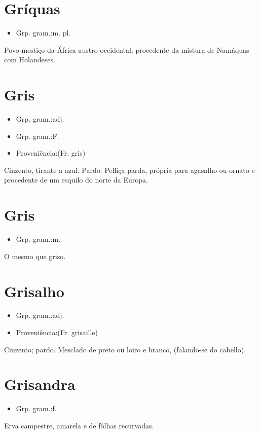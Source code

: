 \section{Gríquas}
\begin{itemize}
\item {Grp. gram.:m. pl.}
\end{itemize}
Povo mestiço da África austro-occidental, procedente da mistura de Namáquas com Holandeses.
\section{Gris}
\begin{itemize}
\item {Grp. gram.:adj.}
\end{itemize}
\begin{itemize}
\item {Grp. gram.:F.}
\end{itemize}
\begin{itemize}
\item {Proveniência:(Fr. \textunderscore gris\textunderscore )}
\end{itemize}
Cinzento, tirante a azul.
Pardo.
Pelliça parda, própria para agasalho ou ornato e procedente de um esquilo do norte da Europa.
\section{Gris}
\begin{itemize}
\item {Grp. gram.:m.}
\end{itemize}
O mesmo que \textunderscore griso\textunderscore .
\section{Grisalho}
\begin{itemize}
\item {Grp. gram.:adj.}
\end{itemize}
\begin{itemize}
\item {Proveniência:(Fr. \textunderscore grisaille\textunderscore )}
\end{itemize}
Cinzento; pardo.
Mesclado de preto ou loiro e branco, (falando-se do cabello).
\section{Grisandra}
\begin{itemize}
\item {Grp. gram.:f.}
\end{itemize}
Erva campestre, amarela e de fôlhas recurvadas.
